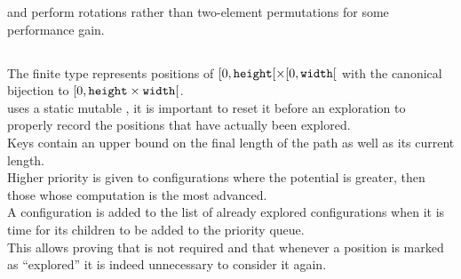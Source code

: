  and  perform rotations rather than two-element permutations
for some performance gain.\\


\subsection{}

The finite type represents positions of \([0,\texttt{height}[ \times [0,\texttt{width}[\)
with the canonical bijection to \([0, \texttt{height}\times\texttt{width}[\).\\

 uses a static mutable , it is important to reset it before
an exploration to properly record the positions that have actually been explored.\\

Keys contain an upper bound on the final length of the path as well as its
current length.\\
Higher priority is given to configurations where the potential is greater, then
those whose computation is the most advanced.\\

A configuration  is added to the list
of already explored configurations when it is time for its children to be added
to the priority queue.\\
This allows proving that  is not required and that whenever a
position is marked as ``explored'' it is indeed unnecessary to consider it again.\\
